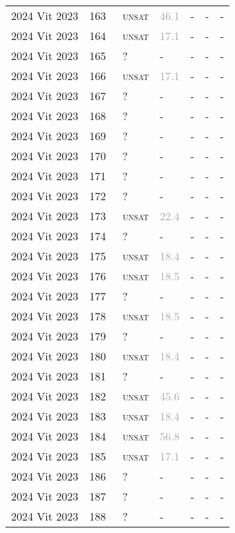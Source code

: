 \begin{center}
{\begin{longtable}{@{}lllllll@{}}
2024 Vit 2023 & 163 & ~\textsc{unsat} & \textcolor{darkgray}{46.1} & - & - & - \\
2024 Vit 2023 & 164 & ~\textsc{unsat} & \textcolor{darkgray}{17.1} & - & - & - \\
2024 Vit 2023 & 165 & ~? & - & - & - & - \\
2024 Vit 2023 & 166 & ~\textsc{unsat} & \textcolor{darkgray}{17.1} & - & - & - \\
2024 Vit 2023 & 167 & ~? & - & - & - & - \\
2024 Vit 2023 & 168 & ~? & - & - & - & - \\
2024 Vit 2023 & 169 & ~? & - & - & - & - \\
2024 Vit 2023 & 170 & ~? & - & - & - & - \\
2024 Vit 2023 & 171 & ~? & - & - & - & - \\
2024 Vit 2023 & 172 & ~? & - & - & - & - \\
2024 Vit 2023 & 173 & ~\textsc{unsat} & \textcolor{darkgray}{22.4} & - & - & - \\
2024 Vit 2023 & 174 & ~? & - & - & - & - \\
2024 Vit 2023 & 175 & ~\textsc{unsat} & \textcolor{darkgray}{18.4} & - & - & - \\
2024 Vit 2023 & 176 & ~\textsc{unsat} & \textcolor{darkgray}{18.5} & - & - & - \\
2024 Vit 2023 & 177 & ~? & - & - & - & - \\
2024 Vit 2023 & 178 & ~\textsc{unsat} & \textcolor{darkgray}{18.5} & - & - & - \\
2024 Vit 2023 & 179 & ~? & - & - & - & - \\
2024 Vit 2023 & 180 & ~\textsc{unsat} & \textcolor{darkgray}{18.4} & - & - & - \\
2024 Vit 2023 & 181 & ~? & - & - & - & - \\
2024 Vit 2023 & 182 & ~\textsc{unsat} & \textcolor{darkgray}{45.6} & - & - & - \\
2024 Vit 2023 & 183 & ~\textsc{unsat} & \textcolor{darkgray}{18.4} & - & - & - \\
2024 Vit 2023 & 184 & ~\textsc{unsat} & \textcolor{darkgray}{56.8} & - & - & - \\
2024 Vit 2023 & 185 & ~\textsc{unsat} & \textcolor{darkgray}{17.1} & - & - & - \\
2024 Vit 2023 & 186 & ~? & - & - & - & - \\
2024 Vit 2023 & 187 & ~? & - & - & - & - \\
2024 Vit 2023 & 188 & ~? & - & - & - & - \\

\end{longtable}}
\end{center}
